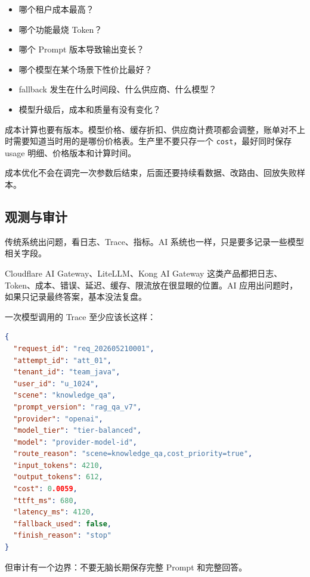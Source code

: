 \documentclass[9pt,a4paper,twocolumn]{ctexart}
\begin{document}
\begin{itemize}[itemsep=1pt, topsep=2pt]
  \item 哪个租户成本最高？
  \item 哪个功能最烧 Token？
  \item 哪个 Prompt 版本导致输出变长？
  \item 哪个模型在某个场景下性价比最好？
  \item fallback 发生在什么时间段、什么供应商、什么模型？
  \item 模型升级后，成本和质量有没有变化？
\end{itemize}


成本计算也要有版本。模型价格、缓存折扣、供应商计费项都会调整，账单对不上时需要知道当时用的是哪份价格表。生产里不要只存一个 \texttt{cost}，最好同时保存 usage 明细、价格版本和计算时间。



成本优化不会在调完一次参数后结束，后面还要持续看数据、改路由、回放失败样本。



\subsection*{观测与审计}


传统系统出问题，看日志、Trace、指标。AI 系统也一样，只是要多记录一些模型相关字段。



Cloudflare AI Gateway、LiteLLM、Kong AI Gateway 这类产品都把日志、Token、成本、错误、延迟、缓存、限流放在很显眼的位置。AI 应用出问题时，如果只记录最终答案，基本没法复盘。



一次模型调用的 Trace 至少应该长这样：



\begin{lstlisting}[language=json]
{
  "request_id": "req_202605210001",
  "attempt_id": "att_01",
  "tenant_id": "team_java",
  "user_id": "u_1024",
  "scene": "knowledge_qa",
  "prompt_version": "rag_qa_v7",
  "provider": "openai",
  "model_tier": "tier-balanced",
  "model": "provider-model-id",
  "route_reason": "scene=knowledge_qa,cost_priority=true",
  "input_tokens": 4210,
  "output_tokens": 612,
  "cost": 0.0059,
  "ttft_ms": 680,
  "latency_ms": 4120,
  "fallback_used": false,
  "finish_reason": "stop"
}
\end{lstlisting}



但审计有一个边界：不要无脑长期保存完整 Prompt 和完整回答。
\end{document}
